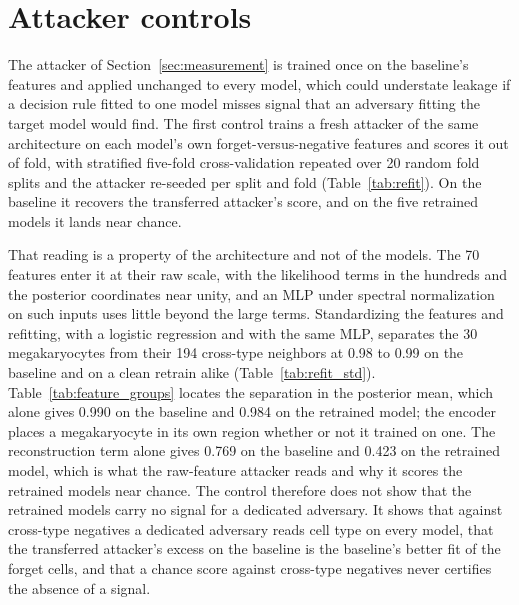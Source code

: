 \documentclass{article}
\begin{document}
\begin{table}[h]
\centering
\caption{Attacker and audit AUCs on Tabula Muris and TCGA-BRCA. Generated from the cohort result files and \texttt{attack\_lr\_reference\_multi.json}.}
\label{tab:crossdataset}
\small
\resizebox{\textwidth}{!}{}
\end{table}

\section{Attacker controls}
\label{app:controls}

The attacker of Section~\ref{sec:measurement} is trained once on the baseline's features and applied unchanged to every model, which could understate leakage if a decision rule fitted to one model misses signal that an adversary fitting the target model would find. The first control trains a fresh attacker of the same architecture on each model's own forget-versus-negative features and scores it out of fold, with stratified five-fold cross-validation repeated over 20 random fold splits and the attacker re-seeded per split and fold (Table~\ref{tab:refit}). On the baseline it recovers the transferred attacker's score, and on the five retrained models it lands near chance.

That reading is a property of the architecture and not of the models. The 70 features enter it at their raw scale, with the likelihood terms in the hundreds and the posterior coordinates near unity, and an MLP under spectral normalization on such inputs uses little beyond the large terms. Standardizing the features and refitting, with a logistic regression and with the same MLP, separates the 30 megakaryocytes from their 194 cross-type neighbors at 0.98 to 0.99 on the baseline and on a clean retrain alike (Table~\ref{tab:refit_std}). Table~\ref{tab:feature_groups} locates the separation in the posterior mean, which alone gives 0.990 on the baseline and 0.984 on the retrained model; the encoder places a megakaryocyte in its own region whether or not it trained on one. The reconstruction term alone gives 0.769 on the baseline and 0.423 on the retrained model, which is what the raw-feature attacker reads and why it scores the retrained models near chance. The control therefore does not show that the retrained models carry no signal for a dedicated adversary. It shows that against cross-type negatives a dedicated adversary reads cell type on every model, that the transferred attacker's excess on the baseline is the baseline's better fit of the forget cells, and that a chance score against cross-type negatives never certifies the absence of a signal.
\end{document}
